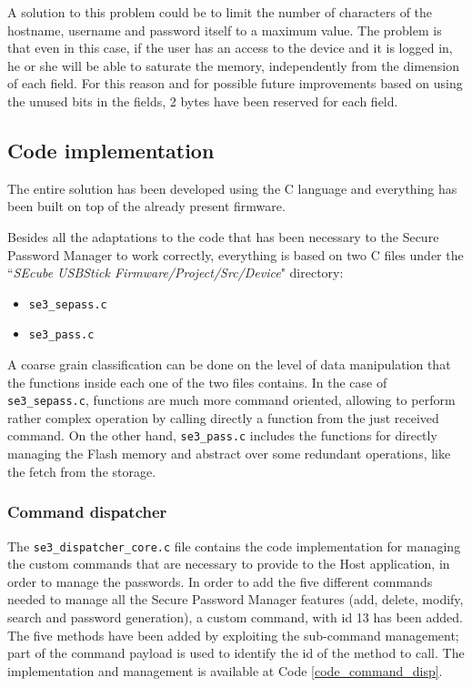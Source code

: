 A solution to this problem could be to limit the number of characters of the hostname, username and password itself to a maximum value. The problem is that even in this case, if the user has an access to the device and it is logged in, he or she will be able to saturate the memory, independently from the dimension of each field. For this reason and for possible future improvements based on using the unused bits in the fields, 2 bytes have been reserved for each field.


\subsection{Code implementation}

The entire solution has been developed using the C language and everything has been built on top of the already present firmware.

Besides all the adaptations to the code that has been necessary to the Secure Password Manager to work correctly, everything is based on two C files under the ``\textit{SEcube USBStick Firmware/Project/Src/Device}" directory:
\begin{itemize}
	\item \texttt{se3\_sepass.c}
	\item \texttt{se3\_pass.c}
\end{itemize}

A coarse grain classification can be done on the level of data manipulation that the functions inside each one of the two files contains. In the case of \texttt{se3\_sepass.c}, functions are much more command oriented, allowing to perform rather complex operation by calling directly a function from the just received command. On the other hand, \texttt{se3\_pass.c} includes the functions for directly managing the Flash memory and abstract over some redundant operations, like the fetch from the storage. 


\subsubsection{Command dispatcher}
The \texttt{se3\_dispatcher\_core.c} file contains the code implementation for managing the custom commands that are necessary to provide to the Host application, in order to manage the passwords.\newline\newline
In order to add the five different commands needed to manage all the Secure Password Manager features (add, delete, modify, search and password generation), a custom command, with id 13 has been added. The five methods have been added by exploiting the sub-command management; part of the command payload is used to identify the id of the method to call. The implementation and management is available at Code \ref{code_command_disp}.


